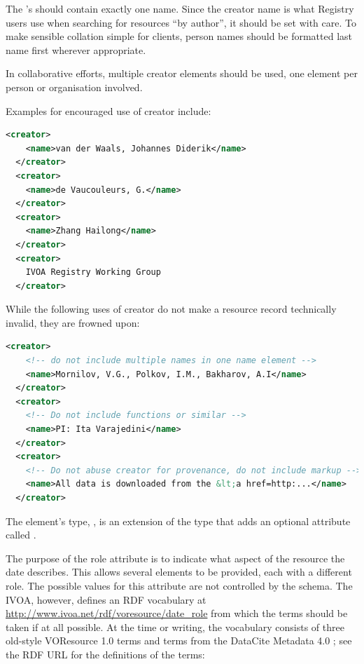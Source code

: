 \documentclass[11pt,a4paper]{ivoa}
\begin{document}

The 's  should contain exactly one name.
Since the creator name is what Registry users use when searching for
resources ``by author'', it should be set with care.  To make sensible
collation simple for clients, person names should be formatted last name
first wherever appropriate.

In collaborative efforts, multiple creator elements should be used, one
element per person or organisation involved.

Examples for encouraged use of creator include:

\begin{lstlisting}[language=XML,basicstyle=\footnotesize]
  <creator>
    <name>van der Waals, Johannes Diderik</name>
  </creator>
  <creator>
    <name>de Vaucouleurs, G.</name>
  </creator>
  <creator>
    <name>Zhang Hailong</name>
  </creator>
  <creator>
    IVOA Registry Working Group
  </creator>
\end{lstlisting}

While the following uses of creator do not make a resource record
technically invalid, they are frowned upon:

\begin{lstlisting}[language=XML,basicstyle=\footnotesize]
  <creator>
    <!-- do not include multiple names in one name element -->
    <name>Mornilov, V.G., Polkov, I.M., Bakharov, A.I</name>
  </creator>
  <creator>
    <!-- Do not include functions or similar -->
    <name>PI: Ita Varajedini</name>
  </creator>
  <creator>
    <!-- Do not abuse creator for provenance, do not include markup -->
    <name>All data is downloaded from the &lt;a href=http:...</name>
  </creator>
\end{lstlisting}

The  element's type, , is an extension of the
 type that adds an
optional attribute called .  

The purpose of the role attribute is to indicate what aspect of the
resource the date describes. This allows several  elements to be
provided, each with a different role. The possible values for this
attribute are not controlled by the schema.  The IVOA, however, defines
an RDF vocabulary at
\url{http://www.ivoa.net/rdf/voresource/date_role} from
which the  terms should be taken if at all possible.  At the
time or writing, the vocabulary consists of three old-style VOResource
1.0 terms and terms from the DataCite Metadata 4.0 \citep{std:DataCite40}; 
see the RDF URL for
the definitions of the terms:
\end{document}
